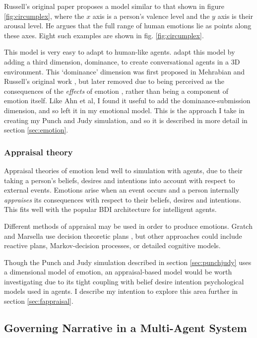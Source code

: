 Russell's original paper proposes a model similar to that shown in figure \ref{fig:circumplex}, where the $x$ axis is a person's valence level and the $y$ axis is their arousal level. He argues that the full range of human emotions lie as points along these axes. Eight such examples are shown in fig. \ref{fig:circumplex}.

This model is very easy to adapt to human-like agents. \citet{ahn2012nvc} adapt this model by adding a third dimension, dominance, to create conversational agents in a 3D environment. This `dominance' dimension was first proposed in Mehrabian and Russell's original work \citep{mehrabian1974approach}, but later removed due to being perceived as the consequences of the \emph{effects\/} of emotion \citep{russell1980circumplex}, rather than being a component of emotion itself. Like Ahn et al, I found it useful to add the dominance-submission dimension, and so left it in my emotional model. This is the approach I take in creating my Punch and Judy simulation, and so it is described in more detail in section \ref{sec:emotion}.

\subsubsection{Appraisal theory}
Appraisal theories of emotion lend well to simulation with agents, due to their taking a person's beliefs, desires and intentions into account with respect to external events. Emotions arise when an event occurs and a person internally \emph{appraises} its consequences with respect to their beliefs, desires and intentions. This fits well with the popular BDI architecture for intelligent agents.

Different methods of appraisal may be used in order to produce emotions. Gratch and Marsella use decision theoretic plans \citep{gratch2004domain}, but other approaches could include reactive plans, Markov-decision processes, or detailed cognitive models.

Though the Punch and Judy simulation described in section \ref{sec:punchjudy} uses a dimensional model of emotion, an appraisal-based model would be worth investigating due to its tight coupling with belief desire intention psychological models used in agents. I describe my intention to explore this area further in section \ref{sec:fappraisal}.



\subsection{Governing Narrative in a Multi-Agent System}
